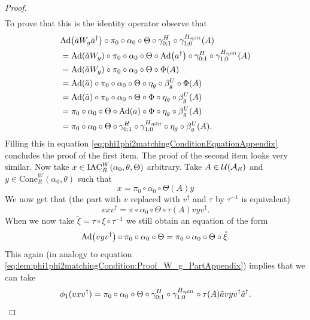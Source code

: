 \documentclass[11pt,a4paper,twoside]{article}
\numberwithin{equation}{section}
\begin{document}
\begin{proof}
\begin{align}
		\end{align}
		To prove that this is the identity operator observe that
		\begin{align}
			&\Ad{\tilde{a}W_g\tilde{a}^\dagger}\circ\pi_0\circ\alpha_0\circ\Theta\circ \gamma^{H}_{0;1}\circ\gamma^{\Hsplit}_{1;0}(A)\\
			&=\Ad{\tilde{a}W_g}\circ\pi_0\circ\alpha_0\circ\Theta\circ\Ad{a^\dagger}\circ \gamma^{H}_{0;1}\circ\gamma^{\Hsplit}_{1;0}(A)\\
			&=\Ad{\tilde{a}W_g}\circ\pi_0\circ\alpha_0\circ\Theta\circ\Phi(A)\\
			&=\Ad{\tilde{a}}\circ\pi_0\circ\alpha_0\circ\Theta\circ\eta_g\circ\beta_g^U\circ\Phi(A)\\
			&=\Ad{\tilde{a}}\circ\pi_0\circ\alpha_0\circ\Theta\circ\Phi\circ\eta_g\circ\beta_g^U(A)\\
			&=\pi_0\circ\alpha_0\circ\Theta\circ\Ad{a}\circ\Phi\circ\eta_g\circ\beta_g^U(A)\\
			&=\pi_0\circ\alpha_0\circ\Theta\circ \gamma^{H}_{0;1}\circ\gamma^{\Hsplit}_{1;0} \circ\eta_g\circ\beta_g^U(A).
		\end{align}
		Filling this in equation \eqref{eq:phi1phi2matchingConditionEquationAppendix} concludes the proof of the first item. The proof of the second item looks very similar. Now take $x\in \textrm{IAC}_R^W(\alpha_0,\theta,\Theta)$ arbitrary. Take $A\in\mathcal U(\mathcal A_R)$ and $y\in\text{Cone}_R^W(\alpha_0,\theta)$ such that
		\begin{equation}
			x=\pi_0\circ\alpha_0\circ\Theta(A)y
		\end{equation}
		We now get that (the part with $v$ replaced with $v^\dagger$ and $\tau$ by $\tau^{-1}$ is equivalent)
		\begin{equation}
			vxv^\dagger=\pi\circ\alpha_0\circ\Theta\circ\tau(A)vyv^\dagger.
		\end{equation}
		When we now take $\tilde\xi=\tau\circ\xi\circ\tau^{-1}$ we still obtain an equation of the form
		\begin{equation}
			\Ad{vyv^\dagger}\circ \pi_0\circ\alpha_0\circ\Theta=\pi_0\circ\alpha_0\circ\Theta\circ\tilde\xi.
		\end{equation}
		This again (in analogy to equation \eqref{eq:lem:phi1phi2matchingCondition:Proof_W_g_PartAppendix}) implies that we can take
		\begin{equation}
			\phi_1(vxv^\dagger)=\pi_0\circ\alpha_0\circ\Theta\circ\gamma^{H}_{0;1}\circ\gamma^{{H_{\text{split}}}}_{1;0}\circ\tau(A)\tilde{a}vyv^\dagger\tilde{a}^\dagger.
		\end{equation}

\end{proof}
\end{document}
